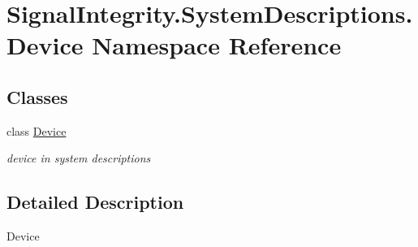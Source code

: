 \hypertarget{namespaceSignalIntegrity_1_1SystemDescriptions_1_1Device}{}\section{Signal\+Integrity.\+System\+Descriptions.\+Device Namespace Reference}
\label{namespaceSignalIntegrity_1_1SystemDescriptions_1_1Device}
\subsection*{Classes}
\begin{DoxyCompactItemize}
\item 
class \hyperlink{classSignalIntegrity_1_1SystemDescriptions_1_1Device_1_1Device}{Device}
\begin{DoxyCompactList}\small\item\em device in system descriptions \end{DoxyCompactList}\end{DoxyCompactItemize}


\subsection{Detailed Description}
\begin{DoxyVerb}Device\end{DoxyVerb}
 